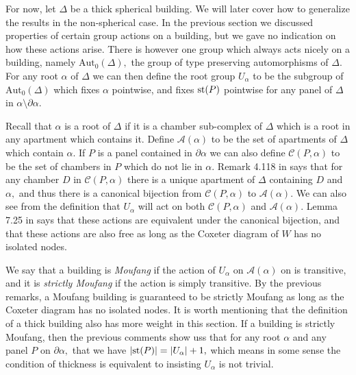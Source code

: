 \documentclass[class=book, crop=false,12 pt]{standalone}
\begin{document}
For now, let $\Delta$ be a thick spherical building. We will later cover how to generalize the results in the non-spherical case. In the previous section we discussed properties of certain group actions on a building, but we gave no indication on how these actions arise. There is however one group which always acts nicely on a building, namely $\mathrm{Aut}_0(\Delta),$ the group of type preserving automorphisms of $\Delta.$ For any root $\alpha$ of $\Delta$ we can then define the root group $U_\alpha$ to be the subgroup of $\mathrm{Aut}_0(\Delta)$ which fixes $\alpha$ pointwise, and fixes $\mathrm{st}(P)$ pointwise for any panel of $\Delta$ in $\alpha\setminus \partial\alpha.$

Recall that $\alpha$ is a root of $\Delta$ if it is a chamber sub-complex of $\Delta$ which is a root in any apartment which contains it. Define $\mathcal{A}(\alpha)$ to be the set of apartments of $\Delta$ which contain $\alpha.$ If $P$ is a panel contained in $\partial\alpha$ we can also define $\mathcal{C}(P,\alpha)$ to be the set of chambers in $P$ which do not lie in $\alpha.$ Remark 4.118 in \cite{buildings} says that for any chamber $D$ in $\mathcal{C}(P,\alpha)$ there is a unique apartment of $\Delta$ containing $D$ and $\alpha,$ and thus there is a canonical bijection from $\mathcal{C}(P,\alpha)$ to $\mathcal{A}(\alpha).$ We can also see from the definition that $U_\alpha$ will act on both $\mathcal{C}(P,\alpha)$ and $\mathcal{A}(\alpha).$ Lemma 7.25 in \cite{buildings} says that these actions are equivalent under the canonical bijection, and that these actions are also free as long as the Coxeter diagram of $W$ has no isolated nodes. 

We say that a building is \emph{Moufang} if the action of $U_\alpha$ on $\mathcal{A}(\alpha)$ on is transitive, and it is \emph{strictly Moufang} if the action is simply transitive. By the previous remarks, a Moufang building is guaranteed to be strictly Moufang as long as the Coxeter diagram has no isolated nodes. It is worth mentioning that the definition of a thick building also has more weight in this section. If a building is strictly Moufang, then the previous comments show uss that for any root $\alpha$ and any panel $P$ on $\partial\alpha,$ that we have $|\mathrm{st}(P)|=|U_\alpha|+1,$ which means in some sense the condition of thickness is equivalent to insisting $U_\alpha$ is not trivial.
\end{document}
